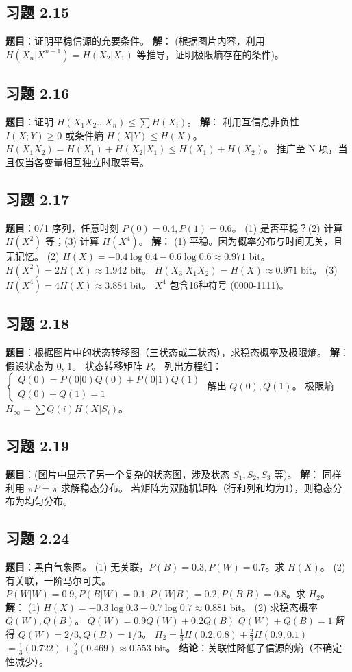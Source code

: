 \documentclass[11pt, a4paper]{article}
\begin{document}
\subsection*{习题 2.15}
\textbf{题目}：证明平稳信源的充要条件。
\textbf{解}：
(根据图片内容，利用 $H(X_n|X^{n-1}) = H(X_2|X_1)$ 等推导，证明极限熵存在的条件)。

\subsection*{习题 2.16}
\textbf{题目}：证明 $H(X_1 X_2 \dots X_n) \le \sum H(X_i)$。
\textbf{解}：
利用互信息非负性 $I(X;Y) \ge 0$ 或条件熵 $H(X|Y) \le H(X)$。
$H(X_1 X_2) = H(X_1) + H(X_2|X_1) \le H(X_1) + H(X_2)$。
推广至 N 项，当且仅当各变量相互独立时取等号。

\subsection*{习题 2.17}
\textbf{题目}：0/1 序列，任意时刻 $P(0)=0.4, P(1)=0.6$。
(1) 是否平稳？(2) 计算 $H(X^2)$ 等；(3) 计算 $H(X^4)$。
\textbf{解}：
(1) 平稳。因为概率分布与时间无关，且无记忆。
(2) $H(X) = -0.4\log0.4 - 0.6\log0.6 \approx 0.971$ bit。
$H(X^2) = 2H(X) \approx 1.942$ bit。
$H(X_3|X_1X_2) = H(X) \approx 0.971$ bit。
(3) $H(X^4) = 4H(X) \approx 3.884$ bit。
$X^4$ 包含16种符号 (0000-1111)。

\subsection*{习题 2.18}
\textbf{题目}：根据图片中的状态转移图（三状态或二状态），求稳态概率及极限熵。
\textbf{解}：
假设状态为 0, 1。
状态转移矩阵 $P$。
列出方程组：
$\begin{cases} Q(0) = P(0|0)Q(0) + P(0|1)Q(1) \\ Q(0) + Q(1) = 1 \end{cases}$
解出 $Q(0), Q(1)$。
极限熵 $H_\infty = \sum Q(i) H(X|S_i)$。

\subsection*{习题 2.19}
\textbf{题目}：(图片中显示了另一个复杂的状态图，涉及状态 $S_1, S_2, S_3$ 等)。
\textbf{解}：
同样利用 $\pi P = \pi$ 求解稳态分布。
若矩阵为双随机矩阵（行和列和均为1），则稳态分布为均匀分布。

\subsection*{习题 2.24}
\textbf{题目}：黑白气象图。
(1) 无关联，$P(B)=0.3, P(W)=0.7$。求 $H(X)$。
(2) 有关联，一阶马尔可夫。$P(W|W)=0.9, P(B|W)=0.1, P(W|B)=0.2, P(B|B)=0.8$。求 $H_2$。
\textbf{解}：
(1) $H(X) = -0.3\log0.3 - 0.7\log0.7 \approx 0.881$ bit。
(2) 求稳态概率 $Q(W), Q(B)$。
$Q(W) = 0.9Q(W) + 0.2Q(B)$
$Q(W) + Q(B) = 1$
解得 $Q(W)=2/3, Q(B)=1/3$。
$H_2 = \frac{1}{3}H(0.2, 0.8) + \frac{2}{3}H(0.9, 0.1)$
$= \frac{1}{3}(0.722) + \frac{2}{3}(0.469) \approx 0.553$ bit。
\textbf{结论}：关联性降低了信源的熵（不确定性减少）。
\end{document}
